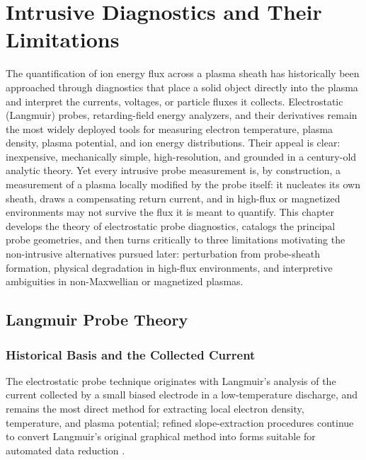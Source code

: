 \chapter{Intrusive Diagnostics and Their Limitations}
\label{ch:probes}

The quantification of ion energy flux across a plasma sheath has historically been approached through diagnostics that place a solid object directly into the plasma and interpret the currents, voltages, or particle fluxes it collects. Electrostatic (Langmuir) probes, retarding-field energy analyzers, and their derivatives remain the most widely deployed tools for measuring electron temperature, plasma density, plasma potential, and ion energy distributions. Their appeal is clear: inexpensive, mechanically simple, high-resolution, and grounded in a century-old analytic theory. Yet every intrusive probe measurement is, by construction, a measurement of a plasma locally modified by the probe itself: it nucleates its own sheath, draws a compensating return current, and in high-flux or magnetized environments may not survive the flux it is meant to quantify. This chapter develops the theory of electrostatic probe diagnostics, catalogs the principal probe geometries, and then turns critically to three limitations motivating the non-intrusive alternatives pursued later: perturbation from probe-sheath formation, physical degradation in high-flux environments, and interpretive ambiguities in non-Maxwellian or magnetized plasmas.

\section{Langmuir Probe Theory}
\label{sec:probes-langmuir-theory}

\subsection{Historical Basis and the Collected Current}

The electrostatic probe technique originates with Langmuir's analysis of the current collected by a small biased electrode in a low-temperature discharge, and remains the most direct method for extracting local electron density, temperature, and plasma potential; refined slope-extraction procedures continue to convert Langmuir's original graphical method into forms suitable for automated data reduction \cite{ref0217}.


